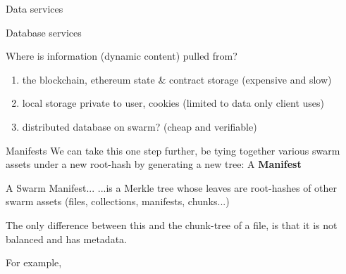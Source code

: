 \documentclass{beamer}
\begin{document}
\begin{section}{Data services}


\begin{frame}{Database services}
\begin{block}{Where is information (dynamic content) pulled from?}
\begin{enumerate}
\item the blockchain, ethereum state \& contract storage (expensive and slow)
\item local storage private to user, cookies (limited to data only client uses)
\item distributed database on swarm? (cheap and verifiable)
\end{enumerate}
\end{block}
\end{frame}





\begin{frame}{Manifests}
 We can take this one step further, be tying together various swarm assets under a new root-hash by generating a new tree: A \textbf{Manifest}\\
 \begin{block}{A Swarm Manifest...}
  ...is a Merkle tree whose leaves are root-hashes of other swarm assets (files, collections, manifests, chunks...)
 \end{block}
 The only difference between this and the chunk-tree of a file, is that it is not balanced and has metadata.
\end{frame}

\begin{frame}
 For example, 
 \end{frame}


\end{section}
\end{document}
